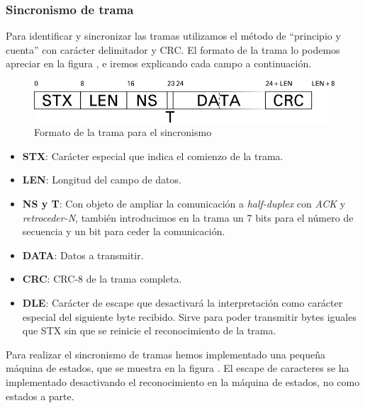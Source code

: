 \newpage
\subsubsection{Sincronismo de trama}
Para identificar y sincronizar las tramas utilizamos el método de ``principio y
cuenta'' con carácter delimitador y CRC. El formato de la trama lo podemos
apreciar en la figura , e iremos explicando cada campo a
continuación.

\begin{figure}[!ht]
	\centering
	\includegraphics[width=\textwidth]{images/frame-sinc}
	\caption{Formato de la trama para el sincronismo}
	\label{fig:frame-sinc}
\end{figure}

\begin{itemize}
	\item \textbf{STX}: Carácter especial que indica el comienzo de la
		trama.
	\item \textbf{LEN}: Longitud del campo de datos.
	\item \textbf{NS y T}:  Con objeto de ampliar la comunicación a
		\textsl{half-duplex} con \textsl{ACK} y \textsl{retroceder-N},
		también introducimos en la trama un 7 bits para el número de
		secuencia y un bit para ceder la comunicación.
	\item \textbf{DATA}: Datos a transmitir.
	\item \textbf{CRC}: CRC-8 de la trama completa.
	\item \textbf{DLE}: Carácter de escape que desactivará la interpretación
		como carácter especial del siguiente byte recibido. Sirve para
		poder transmitir bytes iguales que STX sin que se reinicie el
		reconocimiento de la trama.
\end{itemize}

Para realizar el sincronismo de tramas hemos implementado una pequeña máquina de
estados, que se muestra en la figura . El escape de
caracteres se ha implementado desactivando el reconocimiento en la máquina de
estados, no como estados a parte.

